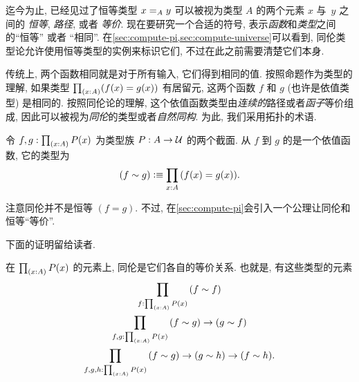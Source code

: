 %

迄今为止, 已经见过了恒等类型 $\id[A]xy$ 可以被视为类型 $A$ 的两个元素 $x$ 与~$y$ 之间的 \emph{恒等}, \emph{路径}, 或者 \emph{等价}.
现在要研究一个合适的符号, 表示\emph{函数}和\emph{类型}之间的``恒等'' 或者 ``相同''.
在\cref{sec:compute-pi,sec:compute-universe}可以看到, 同伦类型论允许使用恒等类型的实例来标识它们, 不过在此之前需要清楚它们本身.

传统上, 两个函数相同就是对于所有输入, 它们得到相同的值.
按照命题作为类型的理解, 如果类型 $\prd{x:A} (f(x)=g(x))$ 有居留元, 这两个函数 $f$ 和 $g$ (也许是依值类型) 是相同的.
按照同伦论的理解, 这个依值函数类型由\emph{连续的}路径或者\emph{函子}等价组成, 因此可以被视为\emph{同伦}的类型或者\emph{自然同构}.
为此, 我们采用拓扑的术语.

\begin{defn}
    \label{defn:homotopy}
    令 $f,g:\prd{x:A} P(x)$ 为类型族 $P:A\to\type$ 的两个截面.
    从 $f$ 到 $g$ 的是一个依值函数, 它的类型为
    \begin{equation*}
    (f\htpy g)
        \defeq \prd{x:A} (f(x)=g(x)).
    \end{equation*}
\end{defn}

注意同伦并不是恒等 $(f=g)$.
不过, 在\cref{sec:compute-pi}会引入一个公理让同伦和恒等``等价''.

下面的证明留给读者.

\begin{lem}
    \label{lem:homotopy-props}
    在 $\prd{x:A} P(x)$ 的元素上, 同伦是它们各自的等价关系.
    也就是, 有这些类型的元素
    \begin{gather*}
        \prd{f:\prd{x:A} P(x)} (f\htpy f)\\
        \prd{f,g:\prd{x:A} P(x)} (f\htpy g) \to (g\htpy f)\\
        \prd{f,g,h:\prd{x:A} P(x)} (f\htpy g) \to (g\htpy h) \to (f\htpy h).
    \end{gather*}
\end{lem}


